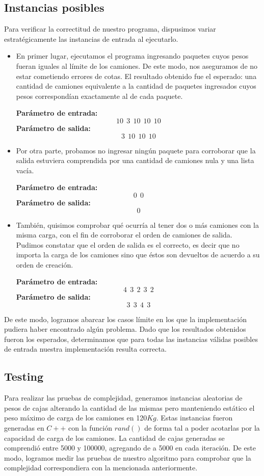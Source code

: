 \subsection{Instancias posibles}
Para verificar la correctitud de nuestro programa, dispusimos variar estratégicamente las instancias de entrada al ejecutarlo.
\begin{itemize}
\item En primer lugar, ejecutamos el programa ingresando paquetes cuyos pesos fueran iguales al límite de los camiones. De este modo, nos aseguramos de no estar cometiendo errores de cotas. El resultado obtenido fue el esperado: una cantidad de camiones equivalente a la cantidad de paquetes ingresados cuyos pesos correspondían exactamente al de cada paquete.\newline

\textbf{Parámetro de entrada:} $$10\ \ 3\ \ 10\ \ 10\ \ 10$$
\textbf{Parámetro de salida:} $$3\ \ 10\ \ 10\ \ 10$$
\item Por otra parte, probamos no ingresar ningún paquete para corroborar que la salida estuviera comprendida por una cantidad de camiones nula y una lista vacía.\newline

\textbf{Parámetro de entrada:} $$0\ \ 0$$
\textbf{Parámetro de salida:} $$0$$
\item También, quisimos comprobar qué ocurría al tener dos o más camiones con la misma carga, con el fin de corroborar el orden de camiones de salida. Pudimos constatar que el orden de salida es el correcto, es decir que no importa la carga de los camiones sino que éstos son devueltos de acuerdo a su orden de creación.\newline

\textbf{Parámetro de entrada:} $$4\ \ 3\ \ 2\ \ 3\ \ 2$$
\textbf{Parámetro de salida:} $$3\ \ 3\ \ 4\ \ 3$$
\end{itemize}

De este modo, logramos abarcar los casos límite en los que la implementación pudiera haber encontrado algún problema. Dado que los resultados obtenidos fueron los esperados, determinamos que para todas las instancias válidas posibles de entrada nuestra implementación resulta correcta.

\subsection{Testing}

Para realizar las pruebas de complejidad, generamos instancias aleatorias de pesos de cajas alterando la cantidad de las mismas pero manteniendo estático el peso máximo de carga de los camiones en 120$Kg$. Estas instancias fueron generadas en $C++$ con la función $rand()$ de forma tal a poder acotarlas por la capacidad de carga de los camiones. La cantidad de cajas generadas se comprendió entre 5000 y 100000, agregando de a 5000 en cada iteración. De este modo, logramos medir las pruebas de nuestro algoritmo para comprobar que la complejidad correspondiera con la mencionada anteriormente.

